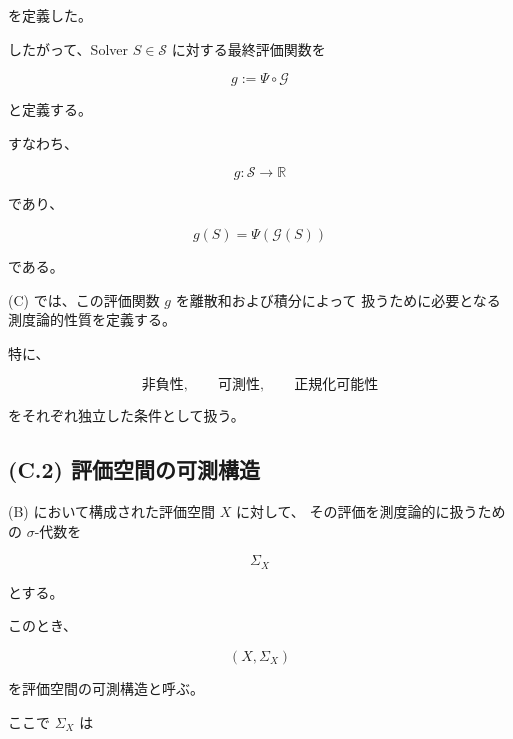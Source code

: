 \documentclass[a4paper,11pt]{article}
\newcommand{\Solver}{\mathcal{S}}
\newcommand{\R}{\mathbb{R}}
\begin{document}
を定義した。

したがって、Solver $S\in\Solver$ に対する最終評価関数を

\begin{equation}
    \boxed{
        g
        :=
        \Psi\circ\mathcal{G}
    }
    \label{eq:C-evaluation-function}
\end{equation}

と定義する。

すなわち、

\begin{equation}
    g:
    \Solver
    \longrightarrow
    \R
\end{equation}

であり、

\begin{equation}
    g(S)
    =
    \Psi\!\left(\mathcal{G}(S)\right)
\end{equation}

である。

(C) では、この評価関数 $g$ を離散和および積分によって
扱うために必要となる測度論的性質を定義する。

特に、

\begin{equation}
    \text{非負性},
    \qquad
    \text{可測性},
    \qquad
    \text{正規化可能性}
\end{equation}

をそれぞれ独立した条件として扱う。


\subsection{(C.2) 評価空間の可測構造}
\label{subsec:C2}

(B) において構成された評価空間 $X$ に対して、
その評価を測度論的に扱うための $\sigma$-代数を

\begin{equation}
    \Sigma_X
\end{equation}

とする。

このとき、

\begin{equation}
    \boxed{
        (X,\Sigma_X)
    }
    \label{eq:C-measurable-evaluation-space}
\end{equation}

を評価空間の可測構造と呼ぶ。

ここで $\Sigma_X$ は
\end{document}
